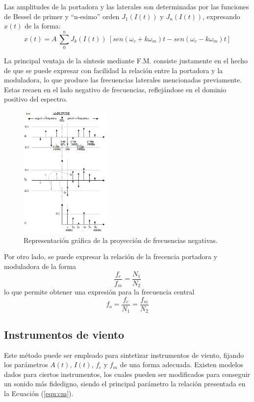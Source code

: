 Las amplitudes de la portadora y las laterales son determinadas por las funciones de Bessel de primer y ``n-esimo'' orden $J_1 \left( I(t) \right)$ y $J_n \left( I(t) \right)$, expresando $x(t)$ de la forma:
\begin{equation}
	x(t) = A \ \sum_{0}^{n} J_k \left(I(t) \right) \ \left[ sen(\omega_c + k \omega_m)t - sen(\omega_c - k \omega_m)t \right]
\end{equation}

La principal ventaja de la síntesis mediante F.M. consiste justamente en el hecho de que se puede expresar con facilidad la relación entre la portadora y la moduladora, lo que produce las frecuencias laterales mencionadas previamente. Estas recaen en el lado negativo de frecuencias, reflejándose en el dominio positivo del espectro. 
\begin{figure}[H]
	\centering
	\includegraphics[width=0.4\textwidth]{ImagenesEjercicio3/Reflecting-f.png}
	\caption{Representación gráfica de la proyección de frecuencias negativas.}
	\label{fig:freflect}
\end{figure}

Por otro lado, se puede expresar la relación de la frecencia portadora y moduladora de la forma
\begin{equation}
	\frac{f_c}{f_m} = \frac{N_1}{N_2}
	\label{equ:cm}
\end{equation}
lo que permite obtener una expresión para la frecuencia central
\begin{equation}
	f_o = \frac{f_c}{N_1} = \frac{f_m}{N_2}
\end{equation}

\subsection{Instrumentos de viento}
Este método puede ser empleado para sintetizar instrumentos de viento, fijando los parámetros $A(t)$, $I(t)$, $f_c$ y $f_m$ de una forma adecuada. Existen modelos dados para ciertos instrumentos, los cuales pueden ser modificados para conseguir un sonido más fidedigno, siendo el principal parámetro la relación presentada en la Ecuación (\ref{equ:cm}).

